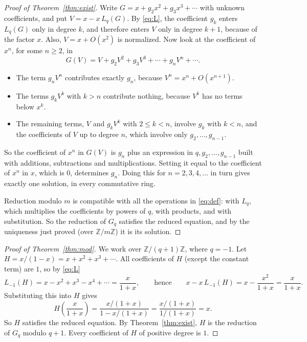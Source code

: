 \documentclass[11pt,a4paper]{article}
\theoremstyle{definition}
\theoremstyle{remark}
\newcommand{\Z}{\mathbb{Z}}
\begin{document}
\begin{proof}[Proof of Theorem~\ref{thm:exist}]
Write $G=x+g_2x^2+g_3x^3+\cdots$ with unknown coefficients, and put $V=x-x\,L_q(G)$. By \eqref{eq:L}, the coefficient
$g_k$ enters $L_q(G)$ only in degree $k$, and therefore enters $V$ only in degree $k+1$, because of the factor $x$. Also,
$V=x+O(x^2)$ is normalized. Now look at the coefficient of $x^n$, for some $n\ge2$, in
\[
G(V)=V+g_2V^2+g_3V^3+\cdots+g_nV^n+\cdots .
\]
\begin{itemize}
\item The term $g_nV^n$ contributes exactly $g_n$, because $V^n=x^n+O(x^{n+1})$.
\item The terms $g_kV^k$ with $k>n$ contribute nothing, because $V^k$ has no terms below $x^k$.
\item The remaining terms, $V$ and $g_kV^k$ with $2\le k<n$, involve $g_k$ with $k<n$, and the coefficients of $V$ up
to degree $n$, which involve only $g_2,\dots,g_{n-1}$.
\end{itemize}
So the coefficient of $x^n$ in $G(V)$ is $g_n$ plus an expression in $q,g_2,\dots,g_{n-1}$ built with additions,
subtractions and multiplications. Setting it equal to the coefficient of $x^n$ in $x$, which is $0$, determines $g_n$.
Doing this for $n=2,3,4,\dots$ in turn gives exactly one solution, in every commutative ring.

Reduction modulo $m$ is compatible with all the operations in \eqref{eq:def}: with $L_q$, which multiplies the
coefficients by powers of $q$, with products, and with substitution. So the reduction of $G_q$ satisfies the reduced
equation, and by the uniqueness just proved (over $\Z/m\Z$) it is its solution.
\end{proof}

\begin{proof}[Proof of Theorem~\ref{thm:mod}]
We work over $\Z/(q+1)\Z$, where $q=-1$. Let $H=x/(1-x)=x+x^2+x^3+\cdots$. All coefficients of $H$ (except the
constant term) are $1$, so by \eqref{eq:L}
\[
L_{-1}(H)=x-x^2+x^3-x^4+\cdots=\frac{x}{1+x},
\qquad\text{hence}\qquad
x-x\,L_{-1}(H)=x-\frac{x^2}{1+x}=\frac{x}{1+x}.
\]
Substituting this into $H$ gives
\[
H\!\left(\frac{x}{1+x}\right)=\frac{x/(1+x)}{1-x/(1+x)}=\frac{x/(1+x)}{1/(1+x)}=x .
\]
So $H$ satisfies the reduced equation. By Theorem~\ref{thm:exist}, $H$ is the reduction of $G_q$ modulo $q+1$. Every
coefficient of $H$ of positive degree is $1$.
\end{proof}
\end{document}
